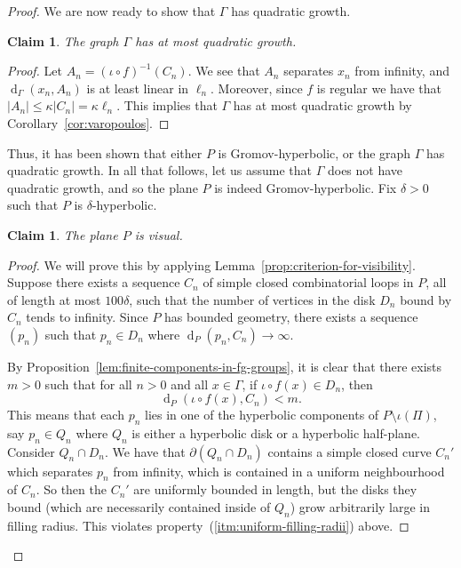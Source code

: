 \documentclass[11pt,a4paper]{amsart}
\DeclareMathOperator{\dist}{d}
\newtheorem{claim}[theorem]{Claim}
\theoremstyle{definition}
\begin{document}
\begin{proof}
        We are now ready to show that $\Gamma$ has quadratic growth. 

        \begin{claim}
            The graph $\Gamma$ has at most quadratic growth. 
        \end{claim}

        \begin{proof}
            Let $A_n = (\iota \circ f)^{-1}(C_n)$. We see that $A_n$ separates $x_n$ from infinity, and $\dist_\Gamma(x_n, A_n)$ is at least linear in $\ell_n$. Moreover, since $f$ is regular we have that $|A_n| \leq \kappa |C_n| = \kappa \ell_n$. This implies that $\Gamma$ has at most quadratic growth by Corollary~\ref{cor:varopoulos}. 
        \end{proof}

        Thus, it has been shown that either $P$ is Gromov-hyperbolic, or the graph $\Gamma$ has quadratic growth. In all that follows, let us assume that $\Gamma$ does not have quadratic growth, and so the plane $P$ is indeed Gromov-hyperbolic. Fix $\delta > 0$ such that $P$ is $\delta$-hyperbolic. 

        \begin{claim}
            The plane $P$ is visual. 
        \end{claim}

        \begin{proof}
            We will prove this by applying Lemma~\ref{prop:criterion-for-visibility}. 
            Suppose there exists a sequence $C_n$ of simple closed combinatorial loops in $P$, all of length at most $100\delta$, such that the number of vertices in the disk $D_n$ bound by $C_n$ tends to infinity. Since $P$ has bounded geometry, there exists a sequence $(p_n)$ such that $p_n \in D_n$ where $\dist_P(p_n, C_n) \to \infty$. 
            
            By Proposition~\ref{lem:finite-components-in-fg-groups}, it is clear that there exists $m > 0$ such that for all $n > 0$ and all $x \in \Gamma$, if $\iota \circ f(x) \in D_n$, then 
            $$
            \dist_P(\iota\circ f(x), C_n) < m.
            $$
			This means that each $p_n$ lies in one of the hyperbolic components of $P \setminus \iota(\Pi)$, say $p_n \in Q_n$ where $Q_n$ is either a hyperbolic disk or a hyperbolic half-plane. Consider $Q_n \cap D_n$. We have that $\partial (Q_n \cap D_n)$ contains a simple closed curve $C_n'$ which separates $p_n$ from infinity, which is contained in a uniform neighbourhood of $C_n$. So then the $C_n'$ are uniformly bounded in length, but the disks they bound (which are necessarily contained inside of $Q_n$) grow arbitrarily large in filling radius. This violates property~(\ref{itm:uniform-filling-radii}) above. 


\end{proof}
\end{proof}
\end{document}
